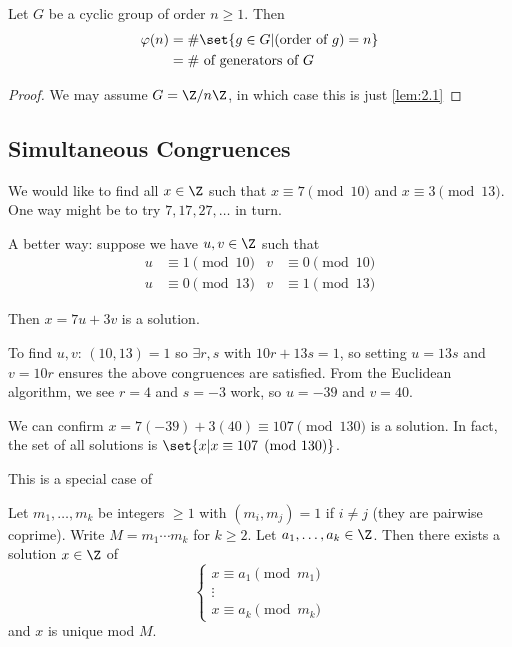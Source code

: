 \documentclass{article}
\begin{document}

\begin{nlemma}\label{lem:2.2}
    Let $G$ be a cyclic group of order $n \geq 1$. Then
    \begin{align*}
        \varphi (n) &=  \# \set{g \in G | (\text{order of } g) = n} \\
                    &=  \# \text{ of generators of } G
    \end{align*}
\end{nlemma}

\begin{proof}
    We may assume $G = \Z/ n \Z$, in which case this is just \cref{lem:2.1}
\end{proof}

\subsection{Simultaneous Congruences}

\begin{eg}
    We would like to find all $x \in \Z$ such that $x \equiv 7 \pmod{10}$ and $x \equiv 3 \pmod{13}$.
    One way might be to try $7, 17, 27, \dotsc$ in turn.

    A better way: suppose we have $u, v \in \Z$ such that
    \begin{align*}
        u &\equiv 1 \pmod{10} & v &\equiv 0 \pmod{10} \\
        u &\equiv 0 \pmod{13} & v &\equiv 1 \pmod{13}
    \end{align*}

    Then $x = 7u + 3v$ is a solution.

    To find $u, v$: $(10, 13) = 1$ so $\exists r, s$ with $10r + 13s = 1$, so setting $u=13s$ and $v=10r$ ensures the above congruences are satisfied.
    From the Euclidean algorithm, we see $r=4$ and $s=-3$ work, so $u=-39$ and $v=40$.

    We can confirm  $x = 7(-39) + 3(40) \equiv 107 \pmod{130}$ is a solution.
    In fact, the set of all solutions is $ \set{ x | x \equiv 107 \pmod {130}} $.
\end{eg}

This is a special case of

\begin{thm}
    Let $m_1, \dotsc, m_k$ be integers $\geq 1$ with $(m_i, m_j) = 1$ if $i \neq j$ (they are pairwise coprime).
    Write $M = m_1 \dotsm m_k$ for $k \geq 2$. Let $a_1, \dotsc, a_k \in \Z$. Then there exists a solution $x \in \Z$ of
    \begin{equation}\label{eq:crt}
        \begin{cases}
            x \equiv a_1 \pmod{m_1} \\ \vdots \\ x \equiv a_k \pmod{m_k}
        \end{cases}
    \end{equation}
    and $x$ is unique mod $M$.
\end{thm}
\end{document}
